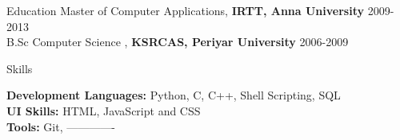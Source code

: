 \documentclass{resume} %
\begin{document}

\begin{rSection}{Education}
{ Master of Computer Applications, \textbf{IRTT, Anna University}} \hfill {2009-2013}
\\
{ B.Sc Computer Science , \textbf{KSRCAS, Periyar University}} \hfill {2006-2009}

  


\end{rSection} 


\begin{rSection}{Skills} \itemsep -3pt  

{\textbf{Development Languages:} Python, C, C++, Shell Scripting, SQL }  \\
{\textbf{UI Skills:} HTML, JavaScript and CSS } \\
{\textbf{Tools:} Git, ------------- } 
\end{rSection}  
 







\end{document}
